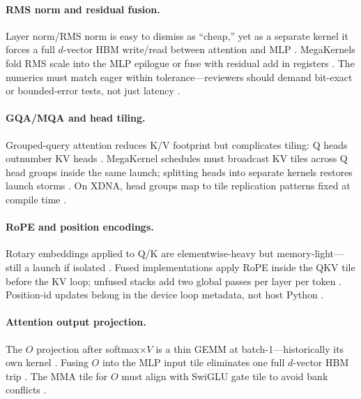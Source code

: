\paragraph{RMS norm and residual fusion.} Layer norm/RMS norm is easy to dismiss as ``cheap,'' yet as a separate kernel it forces a full $d$-vector HBM write/read between attention and MLP \citep{memoryfloor2026,taxbreak2026}. MegaKernels fold RMS scale into the MLP epilogue or fuse with residual add in registers \citep{chen2020compilerbasedhardw,yirage2026}. The numerics must match eager within tolerance---reviewers should demand bit-exact or bounded-error tests, not just latency \citep{patel2025llminference,dlbook}.

\paragraph{GQA/MQA and head tiling.} Grouped-query attention reduces K/V footprint but complicates tiling: Q heads outnumber KV heads \citep{dao2022flashattention,liu2024deepseekv3}. MegaKernel schedules must broadcast KV tiles across Q head groups inside the same launch; splitting heads into separate kernels restores launch storms \citep{taxbreak2026,dao2023flashdecoding}. On XDNA, head groups map to tile replication patterns fixed at compile time \citep{amd2024aie,yirage2026}.

\paragraph{RoPE and position encodings.} Rotary embeddings applied to Q/K are elementwise-heavy but memory-light---still a launch if isolated \citep{patel2025llminference}. Fused implementations apply RoPE inside the QKV tile before the KV loop; unfused stacks add two global passes per layer per token \citep{taxbreak2026,memoryfloor2026}. Position-id updates belong in the device loop metadata, not host Python \citep{kwon2023vllm,nvidia2024cudagraphs}.

\paragraph{Attention output projection.} The $O$ projection after softmax$\times V$ is a thin GEMM at batch-1---historically its own kernel \citep{dao2022flashattention,taxbreak2026}. Fusing $O$ into the MLP input tile eliminates one full $d$-vector HBM trip \citep{memoryfloor2026,chen2020compilerbasedhardw}. The MMA tile for $O$ must align with SwiGLU gate tile to avoid bank conflicts \citep{semianalysis2024tma,nvidia2022hopper}.

